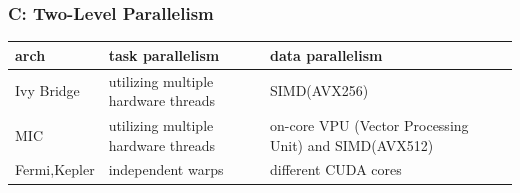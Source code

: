 \documentclass{beamer}
\begin{document}
\begin{frame}
	\frametitle{C: Two-Level Parallelism}
	\begin{table}[bt]
		\begin{tabular}{|p{2.4cm}|p{4cm}|p{4.4cm}|} \hline
		\textbf{arch} & \textbf{task parallelism}	& \textbf{data parallelism} \\ \hline	
		Ivy Bridge & utilizing multiple hardware threads & SIMD(AVX256) \\ \hline			
		MIC & utilizing multiple hardware threads & on-core VPU (Vector Processing Unit) and SIMD(AVX512) \\ \hline	
		Fermi,Kepler & independent warps & different CUDA cores \\ \hline	
		\end{tabular}
	\end{table}					

\end{frame}
\end{document}
